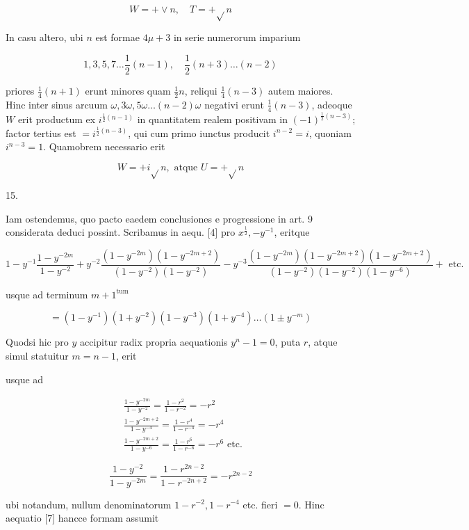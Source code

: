 \documentclass[10pt]{article}
\begin{document}
\[
W=+\vee n, \quad T=+\sqrt{ } n
\]

In casu altero, ubi \(n\) est formae \(4 \mu+3\) in serie numerorum imparium

\[
1,3,5,7 \ldots \frac{1}{2}(n-1), \quad \frac{1}{2}(n+3) \ldots(n-2)
\]

priores \(\frac{1}{4}(n+1)\) erunt minores quam \(\frac{1}{2} n\), reliqui \(\frac{1}{4}(n-3)\) autem maiores. Hinc inter sinus arcuum \(\omega, 3 \omega, 5 \omega \ldots(n-2) \omega\) negativi erunt \(\frac{1}{4}(n-3)\), adeoque \(W\) erit productum ex \(i^{\frac{1}{2}(n-1)}\) in quantitatem realem positivam in \((-1)^{\frac{1}{2}(n-3)}\); factor tertius est \(=i^{\frac{1}{2}(n-3)}\), qui cum primo iunctus producit \(i^{n-2}=i\), quoniam \(i^{n-3}=1\). Quamobrem necessario erit

\[
W=+i \sqrt{ } n, \text { atque } U=+\sqrt{ } n
\]

15.

Iam ostendemus, quo pacto eaedem conclusiones e progressione in art. 9 considerata deduci possint. Scribamus in aequ. [4] pro \(x^{\frac{1}{2}},-y^{-1}\), eritque

\[
1-y^{-1} \frac{1-y^{-2 m}}{1-y^{-2}}+y^{-2} \frac{\left(1-y^{-2 m}\right)\left(1-y^{-2 m+2}\right)}{\left(1-y^{-2}\right)\left(1-y^{-2}\right)}-y^{-3} \frac{\left(1-y^{-2 m}\right)\left(1-y^{-2 m+2}\right)\left(1-y^{-2 m+2}\right)}{\left(1-y^{-2}\right)\left(1-y^{-2}\right)\left(1-y^{-6}\right)}+\text { etc. }
\]

usque ad terminum \(m+1^{\text {tum }}\)

\[
=\left(1-y^{-1}\right)\left(1+y^{-2}\right)\left(1-y^{-3}\right)\left(1+y^{-4}\right) \ldots\left(1 \pm y^{-m}\right)
\]

Quodsi hic pro \(y\) accipitur radix propria aequationis \(y^{n}-1=0\), puta \(r\), atque simul statuitur \(m=n-1\), erit

usque ad

\[
\begin{aligned}
& \frac{1-y^{-2 m}}{1-y^{-2}}=\frac{1-r^{2}}{1-r^{-2}}=-r^{2} \\
& \frac{1-y^{-2 m+2}}{1-y^{-4}}=\frac{1-r^{4}}{1-r^{-4}}=-r^{4} \\
& \frac{1-y^{-2 m+2}}{1-y^{-6}}=\frac{1-r^{6}}{1-r^{-6}}=-r^{6} \text { etc. }
\end{aligned}
\]

\[
\frac{1-y^{-2}}{1-y^{-2 m}}=\frac{1-r^{2 n-2}}{1-r^{-2 n+2}}=-r^{2 n-2}
\]

ubi notandum, nullum denominatorum \(1-r^{-2}, 1-r^{-4}\) etc. fieri \(=0\). Hinc aequatio [7] hancce formam assumit
\end{document}
